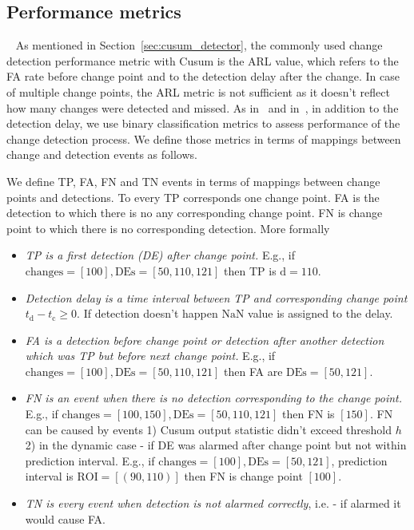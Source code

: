 \subsection{Performance metrics}~\label{sec:performance}
As mentioned in Section~\ref{sec:cusum_detector}, the commonly used change detection performance metric with Cusum is the ARL value, which refers to the FA rate before change point and to the detection delay after the change.
In case of multiple change points, the ARL metric is not sufficient as it doesn't reflect how many changes were detected and missed.
As in~\cite{bodenham2017continuous} and in~\cite{plasse2021streaming}, in addition to the detection delay, we use binary classification metrics to assess performance of the change detection process.
We define those metrics in terms of mappings between change and detection events as follows.
\begin{definition}
	We define TP, FA, FN and TN events in terms of mappings between change points and detections.
	To every TP corresponds one change point.
	FA is the detection to which there is no any corresponding change point.
	FN is change point to which there is no corresponding detection.
	More formally
	\begin{itemize}
    \item \textit{TP is a first detection (DE) after change point.} E.g., if $\text{changes}=[100], \text{DEs}=[50, 110, 121]$ then TP is $\text{d} =110$.

    \item \textit{Detection delay is a time interval between TP and corresponding change point} $t_{\text{d}} - t_{\text{c}} \geq 0$. If detection doesn't happen $\text{NaN}$ value is assigned to the delay.

    \item \textit{FA is a detection before change point or detection after another detection which was TP but before next change point.} E.g., if $\text{changes}=[100], \text{DEs}=[50, 110, 121]$ then FA are $\text{DEs} = [50, 121]$.

    \item \textit{FN is an event when there is no detection corresponding to the change point.} E.g., if $\text{changes}=[100, 150], \text{DEs}=[50, 110, 121]$ then FN is $[150]$. FN can be caused by events 1) Cusum output statistic didn't exceed threshold $h$ 2) in the dynamic case - if DE was alarmed after change point but not within prediction interval. E.g., if $\text{changes}=[100], \text{DEs}=[50, 121]$, prediction interval is $\text{ROI}=[(90, 110)]$ then FN is change point $[100]$.

    \item \textit{TN is every event when detection is not alarmed correctly}, i.e. - if alarmed it would cause FA.

\end{itemize}
\end{definition}
